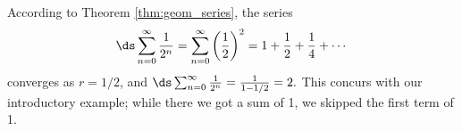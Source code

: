 According to Theorem \ref{thm:geom_series}, the series 
$$\ds\sum_{n=0}^\infty \frac{1}{2^n} =\sum_{n=0}^\infty \left(\frac 12\right)^2= 1+\frac12+\frac14+\cdots$$ converges as $r=1/2$, and $\ds \sum_{n=0}^\infty \frac{1}{2^n} = \frac{1}{1-1/2} = 2.$ This concurs with our introductory example; while there we got a sum of 1, we skipped the first term of 1.\\

\enlargethispage{2\baselineskip}
